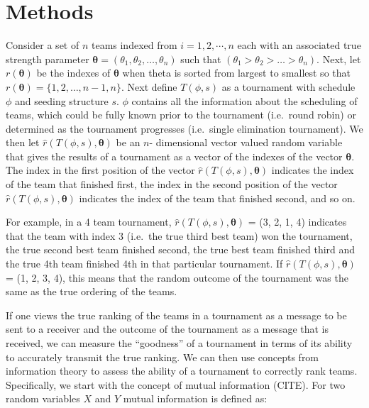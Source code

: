 \documentclass[
  12pt,
]{article}
\begin{document}
\section{Methods}\label{methods}

Consider a set of \(n\) teams indexed from \(i = 1, 2, \cdots, n\) each
with an associated true strength parameter
\(\boldsymbol{\theta} = (\theta_1, \theta_2, \ldots, \theta_n)\) such
that \((\theta_1 > \theta_2 > \ldots > \theta_n)\). Next, let
\(r(\boldsymbol{\theta})\) be the indexes of \(\boldsymbol{\theta}\)
when theta is sorted from largest to smallest so that
\(r(\boldsymbol{\theta}) = \{1, 2, \ldots, n-1, n\}\). Next define
\(T(\phi, s)\) as a tournament with schedule \(\phi\) and seeding
structure \(s\). \(\phi\) contains all the information about the
scheduling of teams, which could be fully known prior to the tournament
(i.e.~round robin) or determined as the tournament progresses
(i.e.~single elimination tournament). We then let
\(\hat{r}(T(\phi, s),\boldsymbol{\theta})\) be an \(n\)- dimensional
vector valued random variable that gives the results of a tournament as
a vector of the indexes of the vector \(\boldsymbol{\theta}\). The index
in the first position of the vector
\(\hat{r}(T(\phi, s),\boldsymbol{\theta})\) indicates the index of the
team that finished first, the index in the second position of the vector
\(\hat{r}(T(\phi, s),\boldsymbol{\theta})\) indicates the index of the
team that finished second, and so on.

For example, in a 4 team tournament,
\(\hat{r}(T(\phi, s),\boldsymbol{\theta})\) = (3, 2, 1, 4) indicates
that the team with index 3 (i.e.~the true third best team) won the
tournament, the true second best team finished second, the true best
team finished third and the true 4th team finished 4th in that
particular tournament. If \(\hat{r}(T(\phi, s),\boldsymbol{\theta})\) =
(1, 2, 3, 4), this means that the random outcome of the tournament was
the same as the true ordering of the teams.

If one views the true ranking of the teams in a tournament as a message
to be sent to a receiver and the outcome of the tournament as a message
that is received, we can measure the ``goodness'' of a tournament in
terms of its ability to accurately transmit the true ranking. We can
then use concepts from information theory to assess the ability of a
tournament to correctly rank teams. Specifically, we start with the
concept of mutual information (CITE). For two random variables \(X\) and
\(Y\) mutual information is defined as:
\end{document}
